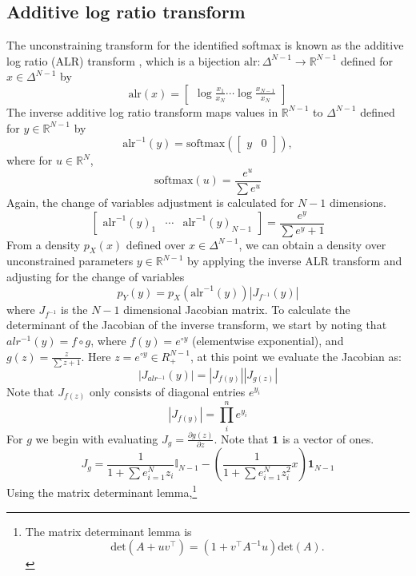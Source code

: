 \documentclass[11pt]{article}
\newcommand{\abs}[1]{\left| #1 \right|}
\newcommand{\absdet}[1]{\abs{#1}}
\begin{document}
\subsection{Additive log ratio transform}

The unconstraining transform for the identified softmax is known as
the additive log ratio (ALR) transform
\cite{aitchison1982statistical}, which is a bijection
$\textrm{alr}:\Delta^{N-1} \rightarrow \mathbb{R}^{N-1}$ defined for
$x \in \Delta^{N-1}$ by
\[
  \textrm{alr}(x)
  = \begin{bmatrix}\displaystyle
    \log \frac{x_1}{x_N} \cdots \log \frac{x_{N-1}}{x_N}
  \end{bmatrix}
\]
The inverse additive log ratio transform maps values in
$\mathbb{R}^{N-1}$ to $\Delta^{N-1}$ defined for $y \in
\mathbb{R}^{N-1}$ by
\[
  \textrm{alr}^{-1}(y)
  = \textrm{softmax}(\begin{bmatrix} y &  0 \end{bmatrix}),
\]
where for $u \in \mathbb{R}^N$,
\[
  \textrm{softmax}(u) = \frac{e^u}{\sum{e^u}}
\]
Again, the change of variables adjustment is calculated for $N-1$ dimensions.  
\[
\begin{bmatrix}
    \textrm{alr}^{-1}(y)_1
    & \cdots &
    \textrm{alr}^{-1}(y)_{N-1}
    \end{bmatrix} = \frac{e^y}{\sum e^y + 1}
\]
From a density $p_X(x)$ defined over $x \in \Delta^{N-1}$,
we can obtain a density over unconstrained parameters $y \in
\mathbb{R}^{N-1}$ by applying the inverse ALR transform and adjusting
for the change of variables
\[
  p_Y(y) = p_X(\textrm{alr}^{-1}(y)) \absdet{J_{f^{-1}}(y)}
\]
where $J_{f^{-1}}$ is the $N-1$ dimensional Jacobian matrix. To calculate the determinant of the Jacobian of the inverse transform,
we start by noting that $alr^{-1}(y) = f \circ g$, where
$f(y) = e^{ \circ y}$ (elementwise exponential), and $g(z)=\frac{z}{\sum z + 1}$. Here $z = e^{\circ y} \in R_{+}^{N-1}$, at this point we evaluate the Jacobian as:
\[
  \absdet{J_{alr^{-1}}(y)}
  = \absdet{J_{f(y)}} \absdet{J_{g(z)}}
\]
Note that $J_{f(z)}$ only consists of diagonal entries $e^{y_{i}}$
\[
  \absdet{J_{f(y)}} = \prod_i^n e^{y_i}
\]
For $g$ we begin with evaluating $ J_{g} = \frac{\partial g(z)}{\partial z}$. Note that $\mathbf{1}$ is a vector of ones.
\[
 J_g = \frac{1}{1 + \sum e_{i=1}^{N} z_i} \mathbb{I}_{N-1}
  - \left(\frac{1}{1 + \sum e_{i=1}^{N} z_i^2} x \right)
  \mathbf{1}_{N-1}
\]
Using the matrix determinant lemma,\footnote{The matrix determinant lemma
  is \[\textrm{det}(A + u v^{\top}) = (1 + v^{\top} A^{-1} u)
    \textrm{det}(A).\]}
\end{document}
